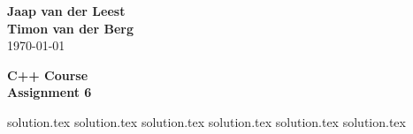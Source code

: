 \documentclass{article}[9pt]
\begin{document}
\begin{flushright}
	\textbf{Jaap van der Leest\\ Timon van der Berg \\ }
\today
\end{flushright}

\begin{center}
\textbf{C++ Course \\
Assignment 6} \\
\end{center}

\tableofcontents


    {solution.tex}
    {solution.tex}
    {solution.tex}
    {solution.tex}
    {solution.tex}
    {solution.tex}
 
\end{document}

